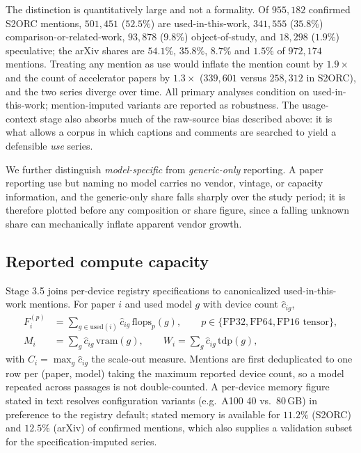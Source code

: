 The distinction is quantitatively large and not a formality. Of $955{,}182$
confirmed S2ORC mentions, $501{,}451$ ($52.5\%$) are used-in-this-work,
$341{,}555$ ($35.8\%$) comparison-or-related-work, $93{,}878$ ($9.8\%$)
object-of-study, and $18{,}298$ ($1.9\%$) speculative; the arXiv shares are
$54.1\%$, $35.8\%$, $8.7\%$ and $1.5\%$ of $972{,}174$ mentions. Treating any
mention as use would inflate the mention count by $1.9\times$ and the count of
accelerator papers by $1.3\times$ ($339{,}601$ versus $258{,}312$ in S2ORC), and
the two series diverge over time. All primary analyses condition on
used-in-this-work; mention-imputed variants are reported as robustness. The
usage-context stage also absorbs much of the raw-source bias described above: it is what allows a corpus in which captions and comments are searched
to yield a defensible \emph{use} series.

We further distinguish \emph{model-specific} from \emph{generic-only} reporting.
A paper reporting use but naming no model carries no vendor, vintage, or
capacity information, and the generic-only share falls sharply over the study
period; it is therefore plotted before any composition or share figure, since a
falling unknown share can mechanically inflate apparent vendor growth.

\subsection{Reported compute capacity}

Stage 3.5 joins per-device registry specifications to canonicalized
used-in-this-work mentions. For paper $i$ and used model $g$ with device count
$\hat c_{ig}$,
\begin{align}
F_i^{(p)} &= \sum_{g \in \mathrm{used}(i)} \hat c_{ig}\,\mathrm{flops}_p(g),
  \qquad p \in \{\text{FP32}, \text{FP64}, \text{FP16 tensor}\},\\
M_i &= \sum_{g} \hat c_{ig}\,\mathrm{vram}(g), \qquad
W_i = \sum_{g} \hat c_{ig}\,\mathrm{tdp}(g),
\end{align}
with $C_i = \max_g \hat c_{ig}$ the scale-out measure. Mentions are first
deduplicated to one row per (paper, model) taking the maximum reported device
count, so a model repeated across passages is not double-counted. A per-device
memory figure stated in text resolves configuration variants (e.g.\ A100 40 vs.\
80\,GB) in preference to the registry default; stated memory is available for
$11.2\%$ (S2ORC) and $12.5\%$ (arXiv) of confirmed mentions, which also supplies
a validation subset for the specification-imputed series.

